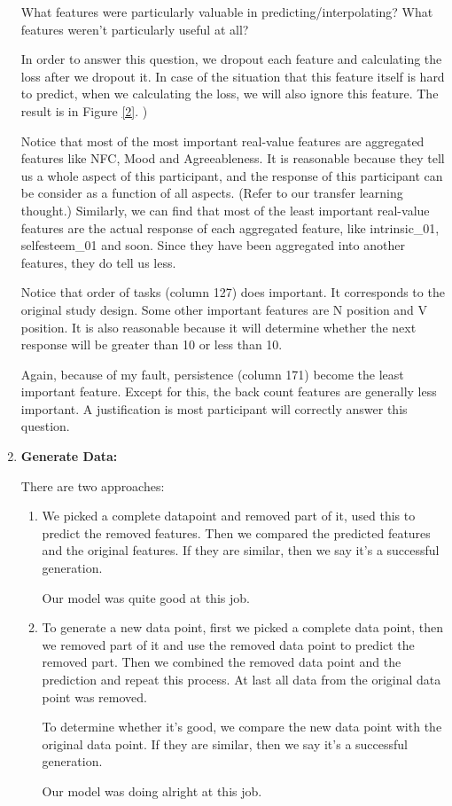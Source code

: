 \documentclass[11pt, a4paper]{article}
\begin{document}
\begin{enumerate}
	\par{What features were particularly valuable in predicting/interpolating? What features weren’t particularly useful at all?}
	
	\par{In order to answer this question, we dropout each feature and calculating the loss after we dropout it. In case of the situation that this feature itself is hard to predict, when we calculating the loss, we will also ignore this feature. The result is in Figure \ref{2}. )
		
		Notice that most of the most important real-value features are aggregated features like NFC, Mood and Agreeableness. It is reasonable because they tell us a whole aspect of this participant, and the response of this participant can be consider as a function of all aspects. (Refer to our transfer learning thought.) Similarly, we can find that most of the least important real-value features are the actual response of each aggregated feature, like intrinsic\_01, selfesteem\_01 and soon. Since they have been aggregated into another features, they do tell us less.
		
		Notice that order of tasks (column 127) does important. It corresponds to the original study design. Some other important features are N position and V position. It is also reasonable because it will determine whether the next response will be greater than 10 or less than 10.
		
		Again, because of my fault, persistence (column 171) become the least important feature. Except for this, the back count features are generally less important. A justification is most participant will correctly answer this question.}
	
	\item {\textbf{Generate Data:}}
	\par{There are two approaches:}
	\begin{enumerate}
		\item {}
		\par{We picked a complete datapoint and removed part of it, used this to predict the removed features. Then we compared the predicted features and the original features. If they are similar, then we say it's a successful generation. }
		\par{Our model was quite good at this job.}
		\item {}
		\par{To generate a new data point, first we picked a complete data point, then we removed part of it and use the removed data point to predict the removed part. Then we combined the removed data point and the prediction and repeat this process. At last all data from the original data point was removed. }
		\par{To determine whether it's good, we compare the new data point with the original data point. If they are similar, then we say it's a successful generation.}
		\par{Our model was doing alright at this job.}
	\end{enumerate}
\end{enumerate}
\end{document}
